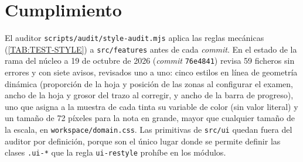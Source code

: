 \section*{Cumplimiento}

El auditor \texttt{scripts/audit/style-audit.mjs} aplica las reglas mecánicas
(\cref{TAB:TEST-STYLE}) a \texttt{src/features} antes de cada \textit{commit}. En el
estado de la rama del núcleo a 19 de octubre de 2026 (\textit{commit}
\texttt{76e4841}) revisa 59 ficheros sin errores y con siete avisos, revisados uno a
uno: cinco estilos en línea de geometría dinámica (proporción de la hoja y posición de
las zonas al configurar el examen, ancho de la hoja y grosor del trazo al corregir, y
ancho de la barra de progreso), uno que asigna a la muestra de cada tinta su variable de
color (sin valor literal) y un tamaño de 72 píxeles para la nota en grande, mayor que
cualquier tamaño de la escala, en \texttt{workspace/domain.css}. Las
primitivas de \texttt{src/ui} quedan fuera del auditor por definición, porque son el
único lugar donde se permite definir las clases \texttt{.ui-*} que la regla
\texttt{ui-restyle} prohíbe en los módulos.

